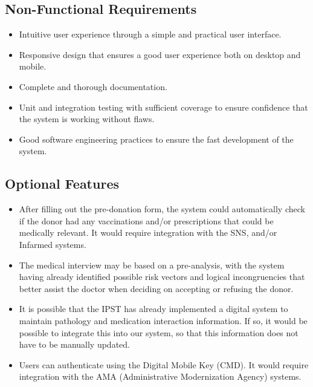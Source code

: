 \subsection{Non-Functional Requirements}
\begin{itemize}
	\item Intuitive user experience through a simple and practical user interface.
	
	\item Responsive design that ensures a good user experience both on desktop and mobile.
	
	\item Complete and thorough documentation.
	
	\item Unit and integration testing with sufficient coverage to ensure confidence that the system is working without flaws.
	
	\item Good software engineering practices to ensure the fast development of the system.
\end{itemize}

\subsection{Optional Features}
\begin{itemize}
	\item After filling out the pre-donation form, the system could automatically check if the donor had any vaccinations and/or prescriptions that could be medically relevant. It would require integration with the SNS, and/or Infarmed systems.
	\item The medical interview may be based on a pre-analysis, with the system having already identified possible risk vectors and logical incongruencies that better assist the doctor when deciding on accepting or refusing the donor.
	\item It is possible that the IPST has already implemented a digital system to maintain pathology and medication interaction information. If so, it would be possible to integrate this into our system, so that this information does not have to be manually updated.
	\item Users can authenticate using the Digital Mobile Key (CMD). It would require integration with the AMA (Administrative Modernization Agency) systems.
\end{itemize}

